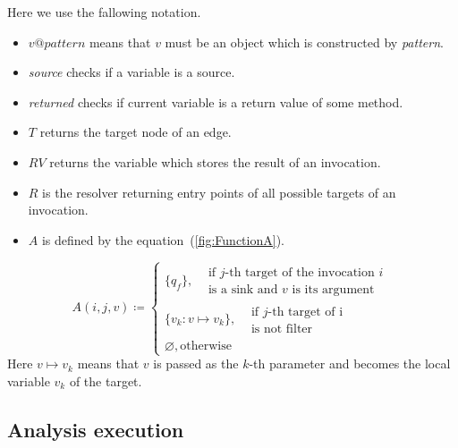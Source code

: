 Here we use the fallowing notation.
\begin{itemize}
 \item $v@\textit{pattern}$ means that $v$ must be an object which is constructed by \textit{pattern}.
 \item \textit{source} checks if a variable is a source.
 \item \textit{returned} checks if current variable is a return value of some method.
 \item $T$ returns the target node of an edge.
 \item $RV$ returns the variable which stores the result of an invocation.
 \item $R$ is the resolver returning entry points of all possible targets of an invocation.
 \item $A$ is defined by the equation~(\ref{fig:FunctionA}).
\end{itemize}

\begin{equation}
    \label{fig:FunctionA}
    A(i, j, v) \coloneqq
    \begin{cases}
        \{q_f\},  \begin{split}&\textrm{if $j$-th target of the invocation $i$} \\ & \textrm{is a sink and $v$ is its argument}\end{split} \\
            \{v_k: v \mapsto v_k\}, \begin{split}&\textrm{if $j$-th target of i} \\ & \textrm{is not filter}\end{split} \\
        \varnothing, \textrm{otherwise}
    \end{cases}
\end{equation}
Here $v \mapsto v_k$ means that $v$ is passed as the $k$-th parameter and becomes the local variable $v_k$ of the target.

\subsection{Analysis execution}

